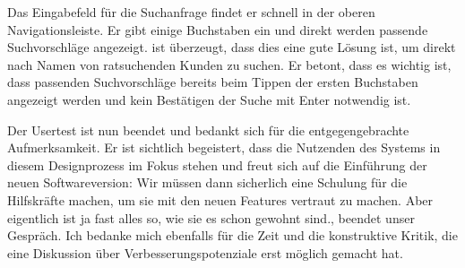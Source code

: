Das Eingabefeld für die Suchanfrage findet er schnell in der oberen
Navigationsleiste. Er gibt einige Buchstaben ein und direkt werden passende
Suchvorschläge angezeigt. \ipName ist überzeugt, dass dies eine gute Lösung
ist, um direkt nach Namen von ratsuchenden Kunden zu suchen. Er betont, dass es
wichtig ist, dass passenden Suchvorschläge bereits beim Tippen der ersten
Buchstaben angezeigt werden und kein Bestätigen der Suche mit Enter notwendig
ist.

Der Usertest ist nun beendet und \ipName bedankt sich für die entgegengebrachte
Aufmerksamkeit. Er ist sichtlich begeistert, dass die Nutzenden des Systems in
diesem Designprozess im Fokus stehen und freut sich auf die Einführung der
neuen Softwareversion: \glqq{}Wir müssen dann sicherlich eine Schulung für die
Hilfskräfte machen, um sie mit den neuen Features vertraut zu machen. Aber
eigentlich ist ja fast alles so, wie sie es schon gewohnt sind.\grqq{}, beendet
\ipName unser Gespräch\cite{clavesUsertest}. Ich bedanke mich ebenfalls für die Zeit und die
konstruktive Kritik, die eine Diskussion über Verbesserungspotenziale erst
möglich gemacht hat.